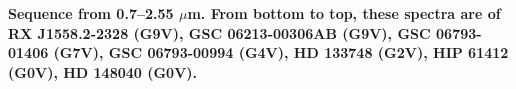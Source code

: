 {\bf Sequence from 0.7–2.55 $\mu$m. From bottom to top, these spectra are of RX J1558.2-2328 (G9V), GSC 06213-00306AB (G9V), GSC 06793-01406 (G7V), GSC 06793-00994 (G4V), HD 133748 (G2V), HIP 61412 (G0V), HD 148040 (G0V).\label{fig:stack-plot-g}}
